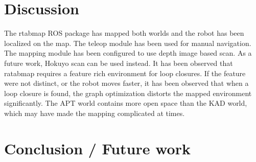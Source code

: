 \documentclass[10pt,journal,compsoc]{IEEEtran}
\begin{document}

\section{Discussion}

The rtabmap ROS package has mapped both worlds and the robot has been localized on the map. The teleop module has been used for manual navigation. The mapping module has been configured to use depth image based scan. As a future work, Hokuyo scan can be used instead. It has been observed that ratabmap requires a feature rich environment for loop closures. If the feature were not distinct, or the robot moves faster, it has been observed that when a loop closure is found, the graph optimization distorts the mapped environment significantly. The APT world contains more open space than the KAD world, which may have made the mapping complicated at times. 


\section{Conclusion / Future work}
\end{document}
